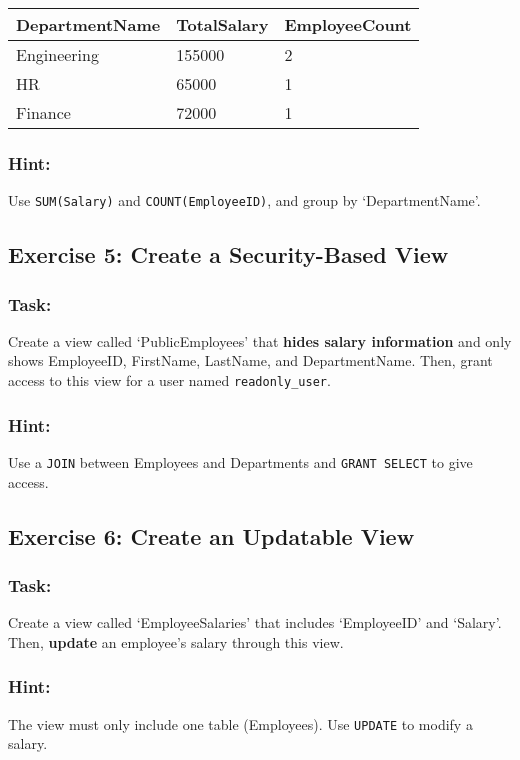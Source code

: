 \documentclass{article}
\begin{document}
\begin{tabular}{|l|l|l|}
\hline
\textbf{DepartmentName} &	\textbf{TotalSalary} &	\textbf{EmployeeCount} \\
\hline
Engineering	 &	 155000 &		2 \\
\hline
HR &		65000 &		1 \\
\hline
Finance &		72000 &		1 \\
\hline
\end{tabular}

\subsubsection*{Hint:}
Use \texttt{SUM(Salary)} and \texttt{COUNT(EmployeeID)}, and group by `DepartmentName'.

\subsection*{Exercise 5: Create a Security-Based View}
\subsubsection*{Task:}
Create a view called `PublicEmployees' that \textbf{hides salary information} and only shows EmployeeID, FirstName, LastName, and DepartmentName.  Then, grant access to this view for a user named \texttt{readonly\_user}.

\subsubsection*{Hint:}
Use a \texttt{JOIN} between Employees and Departments and \texttt{GRANT SELECT} to give access.

\subsection*{Exercise 6: Create an Updatable View}
\subsubsection*{Task:}
Create a view called `EmployeeSalaries' that includes `EmployeeID' and `Salary'. Then, \textbf{update} an employee's salary through this view.

\subsubsection*{Hint:}
The view must only include one table (Employees). Use \texttt{UPDATE} to modify a salary.
\end{document}
